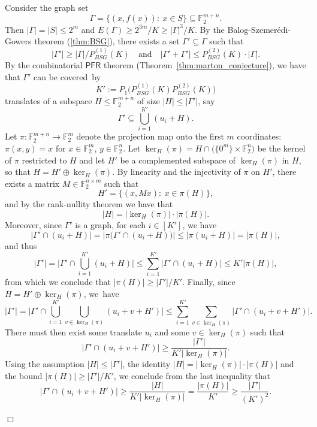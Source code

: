 \documentclass[11pt]{amsart}
\newcommand{\F}{\mathbb{F}} %
\newcommand{\PFR}{\textsf{PFR}}
\theoremstyle{plain}
\theoremstyle{definition}
\theoremstyle{remark}
\renewenvironment{proof}[1][]{
    	\begin{trivlist}
     	\item[\hspace{\labelsep}{\em\noindent Proof#1:\/}]}
     	{{\hfill$\Box$}
    	\end{trivlist}
  }
\begin{document}
\begin{proof}
Consider the graph set
$$\Gamma = \big\{(x, f(x)):\: x\in S\big\} \subseteq \F_2^{m+n}.$$
Then $|\Gamma| = |S| \leq 2^m$ and $E(\Gamma) \geq 2^{3m}/K \geq |\Gamma|^3/K$.
By the Balog-Szemer\'{e}di-Gowers theorem (\cref{thm:BSG}), there exists a set $\Gamma' \subseteq \Gamma$ such that
$$|\Gamma'| \geq |\Gamma|/P_{BSG}^{(1)}(K) \quad \text{and} \quad |\Gamma'+\Gamma'| \leq P_{BSG}^{(2)}(K)\cdot |\Gamma|.$$
By the combinatorial $\PFR$ theorem (Theorem~\ref{thm:marton_conjecture}), we have that $\Gamma'$ can be covered~by
$$K' := P_1\big(P_{BSG}^{(1)}(K) P_{BSG}^{(2)}(K)\big)$$
translates of a subspace $H\leq \F_2^{m+n}$ of size $|H| \leq |\Gamma'|$, say
$$
\Gamma' \subseteq \bigcup_{i=1}^{K'} (u_i + H).
$$
Let $\pi: \F_2^{m+n} \to \F_2^m$ denote the projection map onto the first $m$ coordinates:
$\pi(x, y) = x$ for $x\in \F_2^m$, $y\in \F_2^n$.
Let $\ker_H(\pi) = H \cap \big(\{0^m\} \times \F_2^n\big)$ be the kernel of $\pi$ restricted to $H$ and let $H'$ be a complemented subspace of $\ker_H(\pi)$ in $H$, so that $H = H' \oplus \ker_H(\pi)$.
By linearity and the injectivity of $\pi$ on $H'$, there exists a matrix $M\in \F_2^{n\times m}$ such that
\begin{equation}
\label{eq:Hprime}
    H' = \big\{(x, Mx):\: x\in \pi(H)\big\},
\end{equation}
and by the rank-nullity theorem we have that
$$|H| = |\ker_H(\pi)|\cdot |\pi(H)|.$$
Moreover, since $\Gamma'$ is a graph, for each $i\in [K']$, we have
$$\big|\Gamma' \cap (u_i+H)\big| = \big|\pi\big(\Gamma' \cap (u_i+H)\big)\big| \leq |\pi(u_i+H)| = |\pi(H)|,$$
and thus
$$|\Gamma'| = \Bigg|\Gamma'\cap \bigcup_{i=1}^{K'} (u_i+H)\Bigg| \leq \sum_{i=1}^{K'} \big|\Gamma'\cap (u_i+H)\big| \leq K' |\pi(H)|,$$
from which we conclude that $|\pi(H)| \geq |\Gamma'|/K'$.
Finally, since $H = H' \oplus \ker_H(\pi)$, we~have
$$|\Gamma'| = \Bigg|\Gamma'\cap \bigcup_{i=1}^{K'} \bigcup_{v\in \ker_H(\pi)} (u_i+v+H')\Bigg| \leq \sum_{i=1}^{K'} \sum_{v\in \ker_H(\pi)} \big|\Gamma'\cap (u_i+v+H')\big|.$$
There must then exist some translate $u_i$ and some $v\in \ker_H(\pi)$ such that
$$\big|\Gamma'\cap (u_i+v+H')\big| \geq \frac{|\Gamma'|}{K' |\ker_H(\pi)|}.$$
Using the assumption $|H| \leq |\Gamma'|$, the identity $|H| = |\ker_H(\pi)|\cdot |\pi(H)|$ and the bound $|\pi(H)| \geq |\Gamma'|/K'$, we conclude from the last inequality that
$$\big|\Gamma'\cap (u_i+v+H')\big| \geq \frac{|H|}{K' |\ker_H(\pi)|} = \frac{|\pi(H)|}{K'} \geq \frac{|\Gamma'|}{(K')^2}.$$


\end{proof}
\end{document}

